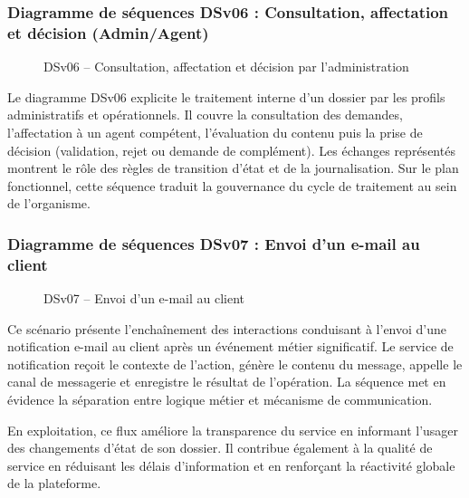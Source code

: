 \newpage
\subsubsection{Diagramme de séquences DSv06 : Consultation, affectation et décision (Admin/Agent)}

\begin{figure}[H]
  \centering
  
  \caption{DSv06 -- Consultation, affectation et décision par l'administration}
  \label{fig:dseq_dsv06}
\end{figure}

Le diagramme DSv06 explicite le traitement interne d'un dossier par les profils administratifs et opérationnels. 
Il couvre la consultation des demandes, l'affectation à un agent compétent, l'évaluation du contenu puis la prise de décision (validation, rejet ou demande de complément). 
Les échanges représentés montrent le rôle des règles de transition d'état et de la journalisation. 
Sur le plan fonctionnel, cette séquence traduit la gouvernance du cycle de traitement au sein de l'organisme.


\newpage
\subsubsection{Diagramme de séquences DSv07 : Envoi d'un e-mail au client}

\begin{figure}[H]
  \centering
  
  \caption{DSv07 -- Envoi d'un e-mail au client}
  \label{fig:dseq_dsv07}
\end{figure}

Ce scénario présente l'enchaînement des interactions conduisant à l'envoi d'une notification e-mail au client après un événement métier significatif. Le service de notification reçoit le contexte de l'action, génère le contenu du message, appelle le canal de messagerie et enregistre le résultat de l'opération. La séquence met en évidence la séparation entre logique métier et mécanisme de communication.

En exploitation, ce flux améliore la transparence du service en informant l'usager des changements d'état de son dossier. Il contribue également à la qualité de service en réduisant les délais d'information et en renforçant la réactivité globale de la plateforme.

